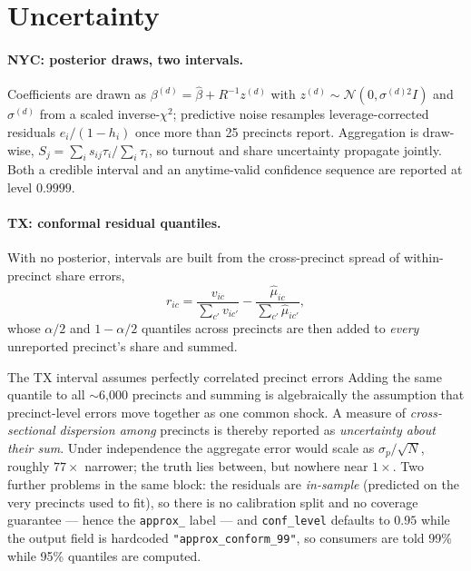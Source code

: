 \documentclass[11pt]{article}
\newcommand{\Norm}{\mathcal{N}}
\begin{document}
\section{Uncertainty}\label{sec:unc}

\paragraph{NYC: posterior draws, two intervals.} Coefficients are drawn as
$\beta^{(d)} = \hat\beta + R^{-1}z^{(d)}$ with $z^{(d)} \sim \Norm(0, \sigma^{(d)2}I)$ and
$\sigma^{(d)}$ from a scaled inverse-$\chi^2$; predictive noise resamples
leverage-corrected residuals $e_i/(1-h_i)$ once more than 25 precincts report. Aggregation
is draw-wise, $S_j = \sum_i s_{ij}\tau_i / \sum_i \tau_i$, so turnout and share uncertainty
propagate jointly. Both a credible interval and an anytime-valid confidence sequence are
reported at level $0.9999$.

\paragraph{TX: conformal residual quantiles.} With no posterior, intervals are built from
the cross-precinct spread of within-precinct share errors,
\begin{equation}
  r_{ic} = \frac{v_{ic}}{\sum_{c'} v_{ic'}} - \frac{\hat\mu_{ic}}{\sum_{c'}\hat\mu_{ic'}},
  \label{eq:conf}
\end{equation}
whose $\alpha/2$ and $1-\alpha/2$ quantiles across precincts are then added to
\emph{every} unreported precinct's share and summed.

\begin{memobox}{The TX interval assumes perfectly correlated precinct errors}
Adding the same quantile to all $\sim$6{,}000 precincts and summing is algebraically the
assumption that precinct-level errors move together as one common shock. A measure of
\emph{cross-sectional dispersion among} precincts is thereby reported as \emph{uncertainty
about their sum}. Under independence the aggregate error would scale as $\sigma_p/\sqrt{N}$,
roughly $77\times$ narrower; the truth lies between, but nowhere near $1\times$. Two
further problems in the same block: the residuals are \emph{in-sample} (predicted on the
very precincts used to fit), so there is no calibration split and no coverage guarantee ---
hence the \texttt{approx\_} label --- and \texttt{conf\_level} defaults to $0.95$ while the
output field is hardcoded \texttt{"approx\_conform\_99"}, so consumers are told 99\% while
95\% quantiles are computed.
\end{memobox}
\end{document}
